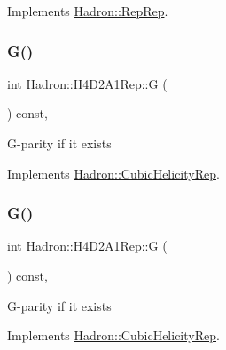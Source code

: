 Implements \mbox{\hyperlink{structHadron_1_1RepRep_a92c8802e5ed7afd7da43ccfd5b7cd92b}{Hadron\+::\+Rep\+Rep}}.

\mbox{\label{structHadron_1_1H4D2A1Rep_adf7afdc418ccacac0b436a1edc71c4be}} 
\subsubsection{\texorpdfstring{G()}{G()}\hspace{0.1cm}{\footnotesize\ttfamily [1/3]}}
{\footnotesize\ttfamily int Hadron\+::\+H4\+D2\+A1\+Rep\+::G (\begin{DoxyParamCaption}{ }\end{DoxyParamCaption}) const\hspace{0.3cm}{\ttfamily [inline]}, {\ttfamily [virtual]}}

G-\/parity if it exists 

Implements \mbox{\hyperlink{structHadron_1_1CubicHelicityRep_a50689f42be1e6170aa8cf6ad0597018b}{Hadron\+::\+Cubic\+Helicity\+Rep}}.

\mbox{\label{structHadron_1_1H4D2A1Rep_adf7afdc418ccacac0b436a1edc71c4be}} 
\subsubsection{\texorpdfstring{G()}{G()}\hspace{0.1cm}{\footnotesize\ttfamily [2/3]}}
{\footnotesize\ttfamily int Hadron\+::\+H4\+D2\+A1\+Rep\+::G (\begin{DoxyParamCaption}{ }\end{DoxyParamCaption}) const\hspace{0.3cm}{\ttfamily [inline]}, {\ttfamily [virtual]}}

G-\/parity if it exists 

Implements \mbox{\hyperlink{structHadron_1_1CubicHelicityRep_a50689f42be1e6170aa8cf6ad0597018b}{Hadron\+::\+Cubic\+Helicity\+Rep}}.

\mbox{\label{structHadron_1_1H4D2A1Rep_adf7afdc418ccacac0b436a1edc71c4be}} 
